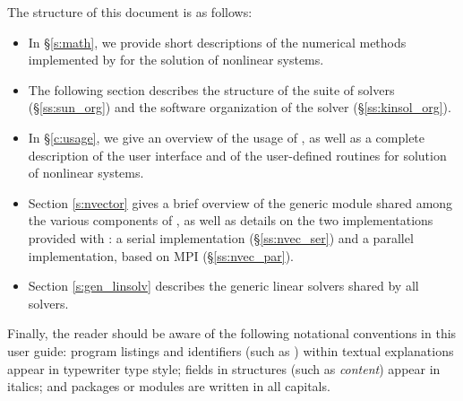 The structure of this document is as follows:
\begin{itemize}
\item
  In \S\ref{s:math}, we provide short descriptions of the numerical
  methods implemented by {\kinsol} for the solution of nonlinear systems.
\item
  The following section describes the structure of the {\sundials} suite
  of solvers (\S\ref{ss:sun_org}) and the software organization of the {\kinsol}
  solver (\S\ref{ss:kinsol_org}).
\item
  In \S\ref{c:usage}, we give an overview of the usage of {\kinsol},
  as well as a complete description of the user interface and of the
  user-defined routines for solution of nonlinear systems.
\item
  Section \ref{s:nvector} gives a brief overview of the generic {\nvector} module
  shared among the various components of {\sundials}, as well as details on the two {\nvector}
  implementations provided with {\sundials}: a serial implementation
  (\S\ref{ss:nvec_ser}) and a parallel implementation, based on MPI
  (\S\ref{ss:nvec_par}).
\item
  Section \ref{s:gen_linsolv} describes the generic linear solvers shared
  by all {\sundials} solvers.
\end{itemize}

Finally, the reader should be aware of the following notational
conventions in this user guide:  program listings and identifiers
(such as ) within textual explanations appear in
typewriter type style; fields in {\C} structures (such as {\em
content}) appear in italics; and packages or modules are written
in all capitals.
